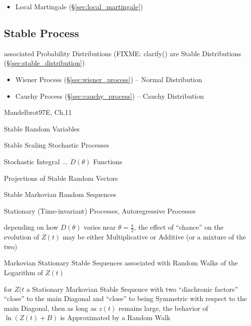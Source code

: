 \begin{itemize}
  \item Local Martingale (\S\ref{sec:local_martingale})
\end{itemize}



\subsection{Stable Process}\label{sec:stable_process}

associated Probability Distributions (FIXME: clarify() are Stable Distributions
(\S\ref{sec:stable_distribution})

\begin{itemize}
  \item Wiener Process (\S\ref{sec:wiener_process}) -- Normal Distribution
  \item Cauchy Process (\S\ref{sec:cauchy_process}) -- Cauchy Distribution
\end{itemize}

Mandelbrot97E, Ch.11

Stable Random Variables

Stable Scaling Stochastic Processes

Stochastic Integral ... $D(\theta)$ Functions

Projections of Stable Random Vectors

Stable Markovian Random Sequences

Stationary (Time-invariant) Processes, Autoregressive Processes

depending on how $D(\theta)$ varies near $\theta = \frac{\pi}{2}$, the effect of
``chance'' on the evolution of $Z(t)$ may be either Multiplicative or Additive
(or a mixture of the two)

Markovian Stationary Stable Sequences associated with Random Walks of the
Logarithm of $Z(t)$

for $Z(t$ a Stationary Markovian Stable Sequence with two ``diachronic factors''
``close'' to the main Diagonal and ``close'' to being Symmetric with respect to
the main Diagonal, then as long as $z(t)$ remains large, the behavior of
$\ln(Z(t) + B)$ is Approximated by a Random Walk



